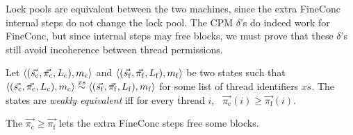 Lock pools are equivalent between the two machines,
since the extra FineConc internal steps do not change the lock pool.
The CPM $\delta$'s do indeed work for FineConc,
but since internal steps may free blocks,
we must prove that these $\delta$'s still avoid
incoherence between thread permissions.

\begin{definition}
  \label{def:weak-equivalence}
  Let
  $\left<(\vec{s_\mathrm{c}},\vec{\pi_\mathrm{c}},L_\mathrm{c}),m_\mathrm{c}
  \right>$
  and
  $\left<(\vec{s_\mathrm{f}}, \vec{\pi_\mathrm{f}},
    L_\mathrm{f}), m_\mathrm{f}\right>$
  be two states such that
  $\left<(\vec{s_\mathrm{c}}, \vec{\pi_\mathrm{c}},
    L_\mathrm{c}), m_\mathrm{c} \right> \stackrel{xs}{\sim}
  \left<(\vec{s_\mathrm{f}}, \vec{\pi_\mathrm{f}},
    L_\mathrm{f}), m_\mathrm{f}\right>$
  for some list of thread identifiers $xs$. The states are
  \emph{weakly equivalent} iff for every thread $i$, 
  ~$\vec{\pi_\mathrm{c}}(i) \geq \vec{\pi_\mathrm{f}}(i)$.
\end{definition}

\noindent The $\vec{\pi_\mathrm{c}} \geq \vec{\pi_\mathrm{f}}$ lets
the extra FineConc steps free some blocks.


